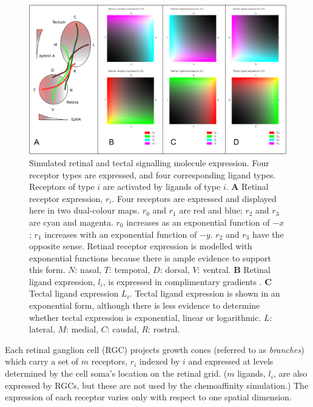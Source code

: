 \documentclass[11pt, a4paper]{article}
\begin{document}
\begin{figure}
\includegraphics[width=\linewidth]{./images/expressions_fig.png}
\caption{Simulated retinal and tectal signalling molecule expression. Four
receptor types are expressed, and four corresponding ligand types. Receptors
of type $i$ are activated by ligands of type $i$.
%
\textbf{A} Retinal receptor expression, $r_i$. Four receptors are expressed and
displayed here in two dual-colour maps. $r_0$ and $r_1$ are red and blue;
$r_2$ and $r_3$ are cyan and magenta. $r_0$ increases as an exponential
function of $-x$; $r_1$ increases with an exponential function of $-y$. $r_2$
and $r_3$ have the opposite sense. Retinal receptor expression is modelled
with exponential functions because there is ample evidence to support this
form. $N$: nasal, $T$: temporal, $D$: dorsal, $V$: ventral.
%
\textbf{B} Retinal ligand expression, $l_i$, is expressed in complimentary
gradients \citep{hornberger_modulation_1999}.
%
\textbf{C} Tectal ligand expression $L_i$. Tectal ligand expression is shown
in an exponential form,
although there is less evidence to determine whether tectal expression is
exponential, linear or logarithmic.
$L$: lateral, $M$: medial, $C$: caudal, $R$: rostral.
}
\label{f:ex}
\end{figure}

Each retinal ganglion cell (RGC) projects growth cones (referred to
as \emph{branches}) which carry a set of $m$ receptors, $r_i$ indexed by $i$ and
expressed at levels determined by the cell soma's location on the
retinal grid. ($m$ ligands, $l_i$, are also expressed by RGCs, but these are not
used by the chemoaffinity simulation.) The expression of each receptor
varies only with respect to one spatial dimension.
\end{document}
